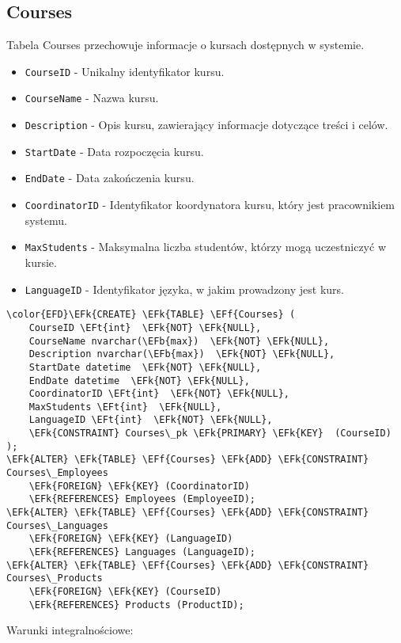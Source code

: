 \documentclass[11pt]{article}
\newcommand{\EFk}[1]{\textcolor{EFk}{\textbf{#1}}} %
\newcommand{\EFb}[1]{\textcolor{EFb}{\textbf{#1}}} %
\newcommand{\EFf}[1]{\textcolor{EFf}{#1}} %
\newcommand{\EFt}[1]{\textcolor{EFt}{\textbf{#1}}} %
\begin{document}
\subsection{Courses}
\label{sec:orgbbe3872}
Tabela Courses przechowuje informacje o kursach dostępnych w systemie.
\begin{itemize}
\item \texttt{CourseID} - Unikalny identyfikator kursu.
\item \texttt{CourseName} - Nazwa kursu.
\item \texttt{Description} - Opis kursu, zawierający informacje dotyczące treści i celów.
\item \texttt{StartDate} - Data rozpoczęcia kursu.
\item \texttt{EndDate} - Data zakończenia kursu.

\item \texttt{CoordinatorID} - Identyfikator koordynatora kursu, który jest pracownikiem systemu.
\item \texttt{MaxStudents} - Maksymalna liczba studentów, którzy mogą uczestniczyć w kursie.
\item \texttt{LanguageID} - Identyfikator języka, w jakim prowadzony jest kurs.
\end{itemize}
\begin{Code}
\begin{Verbatim}
\color{EFD}\EFk{CREATE} \EFk{TABLE} \EFf{Courses} (
    CourseID \EFt{int}  \EFk{NOT} \EFk{NULL},
    CourseName nvarchar(\EFb{max})  \EFk{NOT} \EFk{NULL},
    Description nvarchar(\EFb{max})  \EFk{NOT} \EFk{NULL},
    StartDate datetime  \EFk{NOT} \EFk{NULL},
    EndDate datetime  \EFk{NOT} \EFk{NULL},
    CoordinatorID \EFt{int}  \EFk{NOT} \EFk{NULL},
    MaxStudents \EFt{int}  \EFk{NULL},
    LanguageID \EFt{int}  \EFk{NOT} \EFk{NULL},
    \EFk{CONSTRAINT} Courses\_pk \EFk{PRIMARY} \EFk{KEY}  (CourseID)
);
\EFk{ALTER} \EFk{TABLE} \EFf{Courses} \EFk{ADD} \EFk{CONSTRAINT} Courses\_Employees
    \EFk{FOREIGN} \EFk{KEY} (CoordinatorID)
    \EFk{REFERENCES} Employees (EmployeeID);
\EFk{ALTER} \EFk{TABLE} \EFf{Courses} \EFk{ADD} \EFk{CONSTRAINT} Courses\_Languages
    \EFk{FOREIGN} \EFk{KEY} (LanguageID)
    \EFk{REFERENCES} Languages (LanguageID);
\EFk{ALTER} \EFk{TABLE} \EFf{Courses} \EFk{ADD} \EFk{CONSTRAINT} Courses\_Products
    \EFk{FOREIGN} \EFk{KEY} (CourseID)
    \EFk{REFERENCES} Products (ProductID);
\end{Verbatim}
\end{Code}
Warunki integralnościowe:
\end{document}
